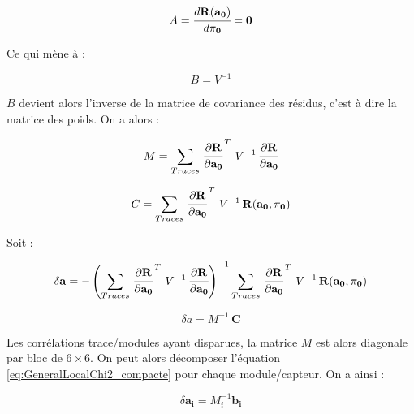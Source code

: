    \begin{equation}
     A =  \cfrac{ d \mathbf{R(a_0)} }{d \mathbf{\pi_0}} = \mathbf{0}
   \end{equation}

   Ce qui m\`ene \`a :
   
   \begin{equation}
    B = V^{-1}
   \end{equation}
   
   $B$ devient alors l'inverse de la matrice de covariance des r\'esidus, c'est \`a dire la matrice des poids. On a alors :
   
   \begin{equation}
    M = \sum_{Traces} \left. \cfrac{ \partial \mathbf{R}}{ \partial \mathbf{a_0}} \right.^T \, V^{-1} \, \cfrac{ \partial \mathbf{R}}{ \partial \mathbf{a_0}}
   \end{equation}
   
   \begin{equation}
    C = \sum_{Traces} \left. \cfrac{ \partial \mathbf{R}}{ \partial \mathbf{a_0}} \right.^T \, V^{-1} \, \mathbf{R}(\mathbf{a_0}, \mathbf{\pi_0})
   \end{equation}

   Soit : 
   
   \begin{equation}
    \delta \mathbf{a} = - \left( \sum_{Traces} \left. \cfrac{ \partial \mathbf{R}}{ \partial \mathbf{a_0}} \right.^T \, V^{-1} \, \cfrac{ \partial \mathbf{R}}{ \partial \mathbf{a_0}} \right)^{-1} \sum_{Traces} \left. \cfrac{ \partial \mathbf{R}}{ \partial \mathbf{a_0}} \right.^T \, V^{-1} \, \mathbf{R}(\mathbf{a_0}, \mathbf{\pi_0})
    \label{eq:GeneralLocalChi2}
   \end{equation}
   
   \begin{equation}
    \delta a = M^{-1} \, \mathbf{C}
    \label{eq:GeneralLocalChi2_compacte}
   \end{equation}

   
   Les corrélations trace/modules ayant disparues, la matrice $M$ est alors diagonale par bloc de $6 \times 6$. On peut alors d\'ecomposer l'équation \ref{eq:GeneralLocalChi2_compacte} pour chaque module/capteur. On a ainsi :
   
   \begin{equation}
    \delta \mathbf{a_i} = M_i^{-1} \mathbf{b_i}
   \end{equation}
   
